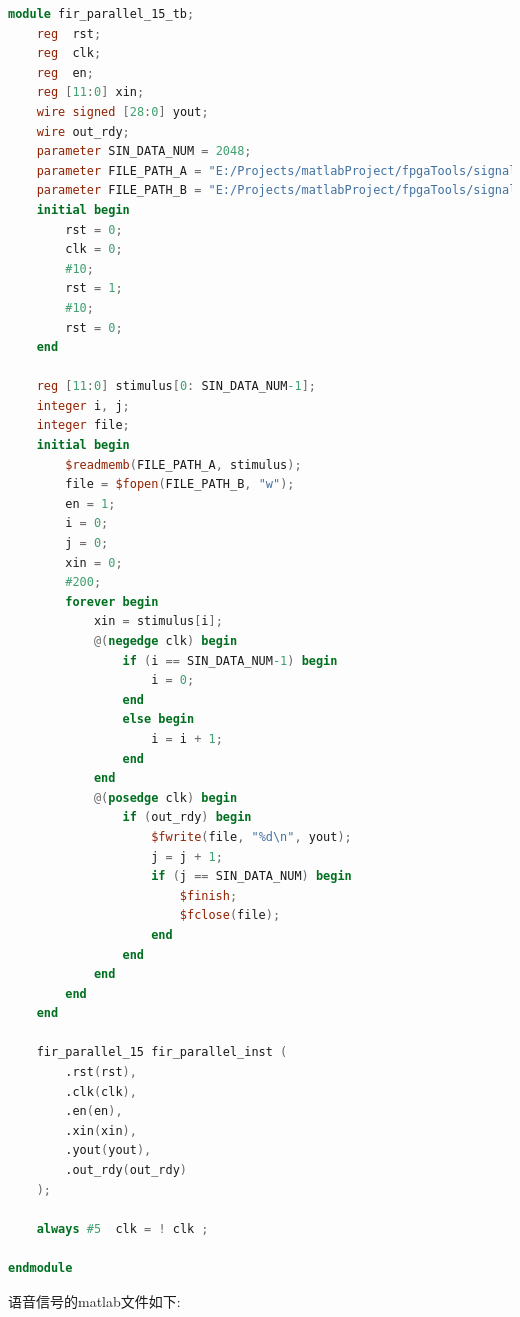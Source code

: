 \documentclass{article}
\begin{document}
\begin{lstlisting}[language=Verilog, caption={15阶并行FIR滤波器的仿真文件}]
module fir_parallel_15_tb;
    reg  rst;
    reg  clk;
    reg  en;
    reg [11:0] xin;
    wire signed [28:0] yout;
    wire out_rdy;
    parameter SIN_DATA_NUM = 2048;
    parameter FILE_PATH_A = "E:/Projects/matlabProject/fpgaTools/signal_data.txt";
    parameter FILE_PATH_B = "E:/Projects/matlabProject/fpgaTools/signal_res.txt";   
    initial begin
        rst = 0;
        clk = 0;
        #10;
        rst = 1;
        #10;
        rst = 0;
    end

    reg [11:0] stimulus[0: SIN_DATA_NUM-1];
    integer i, j;
    integer file;
    initial begin
        $readmemb(FILE_PATH_A, stimulus);
        file = $fopen(FILE_PATH_B, "w");
        en = 1;
        i = 0;
        j = 0;
        xin = 0;
        #200;
        forever begin
            xin = stimulus[i];
            @(negedge clk) begin
                if (i == SIN_DATA_NUM-1) begin
                    i = 0;
                end
                else begin
                    i = i + 1;
                end
            end
            @(posedge clk) begin
                if (out_rdy) begin
                    $fwrite(file, "%d\n", yout);
                    j = j + 1;
                    if (j == SIN_DATA_NUM) begin
                        $finish;
                        $fclose(file);
                    end
                end
            end
        end
    end
   
    fir_parallel_15 fir_parallel_inst (
        .rst(rst),
        .clk(clk),
        .en(en),
        .xin(xin),
        .yout(yout),
        .out_rdy(out_rdy)
    );

    always #5  clk = ! clk ;

endmodule
\end{lstlisting}
语音信号的matlab文件如下:
\end{document}
